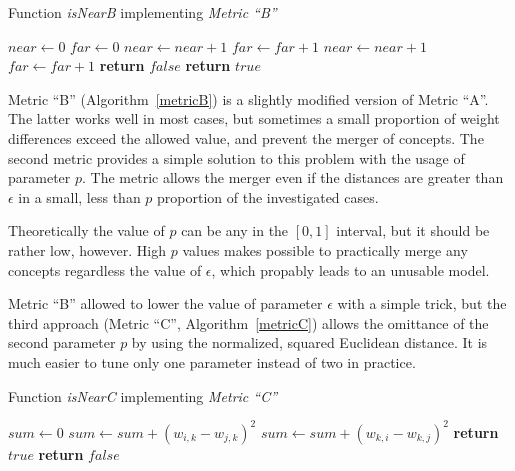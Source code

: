 \documentclass[graybox]{svmult}
\begin{document}
\begin{algorithm}
  \caption{Function \emph{isNearB} implementing \emph{Metric ``B''}}\label{metricB}
  \begin{algorithmic}[1]
      \State $near \gets 0$
      \State $far \gets 0$
            \State $near \gets near + 1$
          \Else
            \State $far \gets far + 1$
          \EndIf
            \State $near \gets near + 1$
          \Else
            \State $far \gets far + 1$
          \EndIf
        \EndIf
      \EndFor
        \State \textbf{return} $false$
      \Else
        \State \textbf{return} $true$
      \EndIf
    \EndFunction
  \end{algorithmic}
\end{algorithm}

Metric ``B'' (Algorithm~\ref{metricB}) is a slightly modified version of Metric ``A''. The latter works well in most cases, but sometimes a small proportion of weight differences exceed the allowed value, and prevent the merger of concepts. The second metric provides a simple solution to this problem with the usage of parameter $p$. The metric allows the merger even if the distances are greater than $\epsilon$ in a small, less than $p$ proportion of the investigated cases.

Theoretically the value of $p$ can be any in the $[0, 1]$ interval, but it should be rather low, however. High $p$ values makes possible to practically merge any concepts regardless the value of $\epsilon$, which propably leads to an unusable model.

Metric ``B'' allowed to lower the value of parameter $\epsilon$ with a simple trick, but the third approach (Metric ``C'', Algorithm~\ref{metricC}) allows the omittance of the second parameter $p$ by using the normalized, squared Euclidean distance. It is much easier to tune only one parameter instead of two in practice.

\begin{algorithm}
  \caption{Function \emph{isNearC} implementing \emph{Metric ``C''}}\label{metricC}
  \begin{algorithmic}[1]
      \State $sum \gets 0$
          \State $sum \gets sum + (w_{i, k} - w_{j, k})^2$
          \State $sum \gets sum + (w_{k, i} - w_{k, j})^2$
        \EndIf
      \EndFor
        \State \textbf{return} $true$
      \Else
        \State \textbf{return} $false$
      \EndIf
    \EndFunction
  \end{algorithmic}
\end{algorithm}
\end{document}
